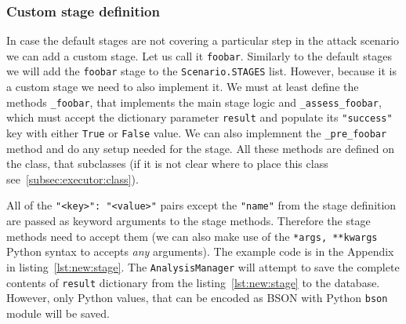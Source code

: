 
            
    



    \subsubsection{Custom stage definition}\label{subsubsec:custom-stage}
    In case the default stages are not covering a particular step in the attack scenario we can add a custom stage. Let us call it \texttt{foobar}. Similarly to the default stages we will add the \texttt{foobar} stage to the \texttt{Scenario.STAGES} list. However, because it is a custom stage we need to also implement it. We must at least define the methods \texttt{_foobar}, that implements the main stage logic and \texttt{_assess_foobar}, which must accept the dictionary parameter \texttt{result} and populate its \texttt{"success"} key with either \texttt{True} or \texttt{False} value. We can also implemnent the \texttt{_pre_foobar} method and do any setup needed for the stage. All these methods are defined on the \attackexecutor class, that subclasses \shortexecutorclass (if it is not clear where to place this class see~\ref{subsec:executor:class}).



        All of the \texttt{"<key>": "<value>"} pairs except the \texttt{"name"} from the stage definition are passed as keyword arguments to the stage methods. Therefore the stage methods need to accept them (we can also make use of the \texttt{*args, **kwargs} Python syntax to accepts \textit{any} arguments). The example code is in the Appendix in listing~\ref{lst:new:stage}. The \texttt{AnalysisManager} will attempt to save the complete contents of \texttt{result} dictionary from the listing~\ref{lst:new:stage} to the database. However, only Python values, that can be encoded as BSON with Python \texttt{bson} module will be saved.


